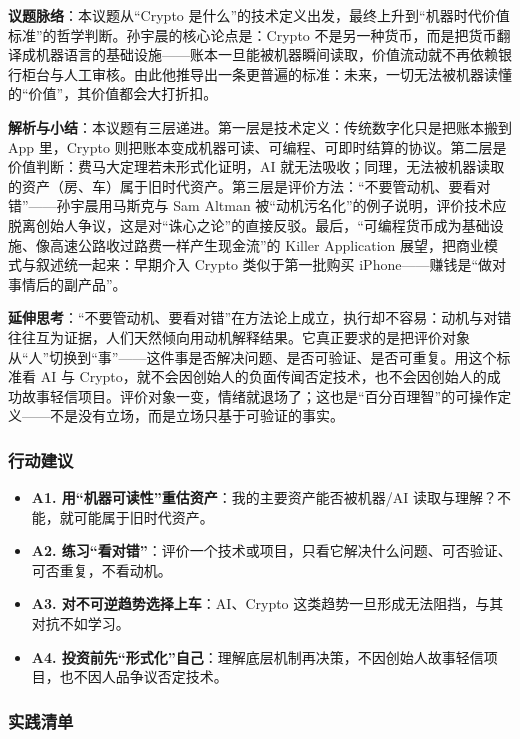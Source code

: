 \textbf{议题脉络}：本议题从``Crypto
是什么''的技术定义出发，最终上升到``机器时代价值标准''的哲学判断。孙宇晨的核心论点是：Crypto
不是另一种货币，而是把货币翻译成机器语言的基础设施------账本一旦能被机器瞬间读取，价值流动就不再依赖银行柜台与人工审核。由此他推导出一条更普遍的标准：未来，一切无法被机器读懂的``价值''，其价值都会大打折扣。

\textbf{解析与小结}：本议题有三层递进。第一层是技术定义：传统数字化只是把账本搬到
App 里，Crypto
则把账本变成机器可读、可编程、可即时结算的协议。第二层是价值判断：费马大定理若未形式化证明，AI
就无法吸收；同理，无法被机器读取的资产（房、车）属于旧时代资产。第三层是评价方法：``不要管动机、要看对错''------孙宇晨用马斯克与
Sam Altman
被``动机污名化''的例子说明，评价技术应脱离创始人争议，这是对``诛心之论''的直接反驳。最后，``可编程货币成为基础设施、像高速公路收过路费一样产生现金流''的
Killer Application 展望，把商业模式与叙述统一起来：早期介入 Crypto
类似于第一批购买 iPhone------赚钱是``做对事情后的副产品''。

\textbf{延伸思考}：``不要管动机、要看对错''在方法论上成立，执行却不容易：动机与对错往往互为证据，人们天然倾向用动机解释结果。它真正要求的是把评价对象从``人''切换到``事''------这件事是否解决问题、是否可验证、是否可重复。用这个标准看
AI 与
Crypto，就不会因创始人的负面传闻否定技术，也不会因创始人的成功故事轻信项目。评价对象一变，情绪就退场了；这也是``百分百理智''的可操作定义------不是没有立场，而是立场只基于可验证的事实。

\subsubsection{行动建议}

\begin{itemize}
\tightlist
\item
  \textbf{A1. 用``机器可读性''重估资产}：我的主要资产能否被机器/AI
  读取与理解？不能，就可能属于旧时代资产。
\item
  \textbf{A2.
  练习``看对错''}：评价一个技术或项目，只看它解决什么问题、可否验证、可否重复，不看动机。
\item
  \textbf{A3. 对不可逆趋势选择上车}：AI、Crypto
  这类趋势一旦形成无法阻挡，与其对抗不如学习。
\item
  \textbf{A4.
  投资前先``形式化''自己}：理解底层机制再决策，不因创始人故事轻信项目，也不因人品争议否定技术。
\end{itemize}

\subsubsection{实践清单}

